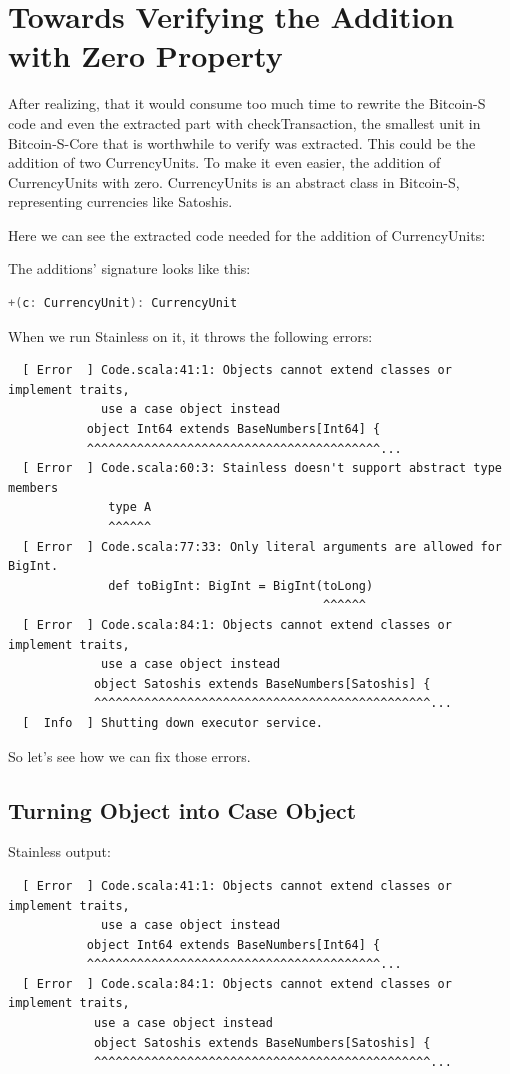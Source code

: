 \chapter{Towards Verifying the Addition with Zero Property}
\label{chap:verify_add}

After realizing, that it would consume too much time to rewrite the Bitcoin-S code and even the extracted part with checkTransaction, the smallest unit in Bitcoin-S-Core that is worthwhile to verify was extracted.
This could be the addition of two CurrencyUnits.
To make it even easier, the addition of CurrencyUnits with zero.
CurrencyUnits is an abstract class in Bitcoin-S, representing currencies like Satoshis.

Here we can see the extracted code needed for the addition of CurrencyUnits:


The additions' signature looks like this:
\begin{lstlisting}[language=scala]
  +(c: CurrencyUnit): CurrencyUnit
\end{lstlisting}

When we run Stainless on it, it throws the following errors:
{\footnotesize\begin{verbatim}
  [ Error  ] Code.scala:41:1: Objects cannot extend classes or implement traits,
             use a case object instead
           object Int64 extends BaseNumbers[Int64] {
           ^^^^^^^^^^^^^^^^^^^^^^^^^^^^^^^^^^^^^^^^^...
  [ Error  ] Code.scala:60:3: Stainless doesn't support abstract type members
              type A
              ^^^^^^
  [ Error  ] Code.scala:77:33: Only literal arguments are allowed for BigInt.
              def toBigInt: BigInt = BigInt(toLong)
                                            ^^^^^^
  [ Error  ] Code.scala:84:1: Objects cannot extend classes or implement traits,
             use a case object instead
            object Satoshis extends BaseNumbers[Satoshis] {
            ^^^^^^^^^^^^^^^^^^^^^^^^^^^^^^^^^^^^^^^^^^^^^^^...
  [  Info  ] Shutting down executor service.
\end{verbatim}}

So let's see how we can fix those errors.


\section{Turning Object into Case Object}

Stainless output:
{\footnotesize\begin{verbatim}
  [ Error  ] Code.scala:41:1: Objects cannot extend classes or implement traits,
             use a case object instead
           object Int64 extends BaseNumbers[Int64] {
           ^^^^^^^^^^^^^^^^^^^^^^^^^^^^^^^^^^^^^^^^^...
  [ Error  ] Code.scala:84:1: Objects cannot extend classes or implement traits,
            use a case object instead
            object Satoshis extends BaseNumbers[Satoshis] {
            ^^^^^^^^^^^^^^^^^^^^^^^^^^^^^^^^^^^^^^^^^^^^^^^...
\end{verbatim}}

